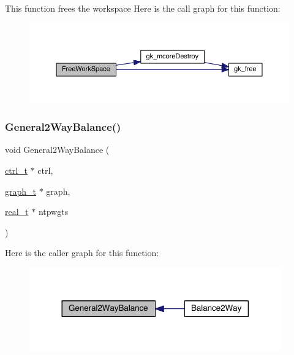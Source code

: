 This function frees the workspace Here is the call graph for this function\+:\nopagebreak
\begin{figure}[H]
\begin{center}
\leavevmode
\includegraphics[width=350pt]{a00945_a0176e7569d59bfac1b0fc2d2fa9ac2f9_cgraph}
\end{center}
\end{figure}
\mbox{\label{a00945_a726f3ab2e1dbf55fcf3c6a31037542f5}} 
\subsubsection{\texorpdfstring{General2\+Way\+Balance()}{General2WayBalance()}}
{\footnotesize\ttfamily void General2\+Way\+Balance (\begin{DoxyParamCaption}\item[{\hyperlink{a00742}{ctrl\+\_\+t} $\ast$}]{ctrl,  }\item[{\hyperlink{a00734}{graph\+\_\+t} $\ast$}]{graph,  }\item[{\hyperlink{a00876_a1924a4f6907cc3833213aba1f07fcbe9}{real\+\_\+t} $\ast$}]{ntpwgts }\end{DoxyParamCaption})}

Here is the caller graph for this function\+:\nopagebreak
\begin{figure}[H]
\begin{center}
\leavevmode
\includegraphics[width=308pt]{a00945_a726f3ab2e1dbf55fcf3c6a31037542f5_icgraph}
\end{center}
\end{figure}
\mbox{\label{a00945_a1a9713647a69a41fb87323964119ab40}} 
